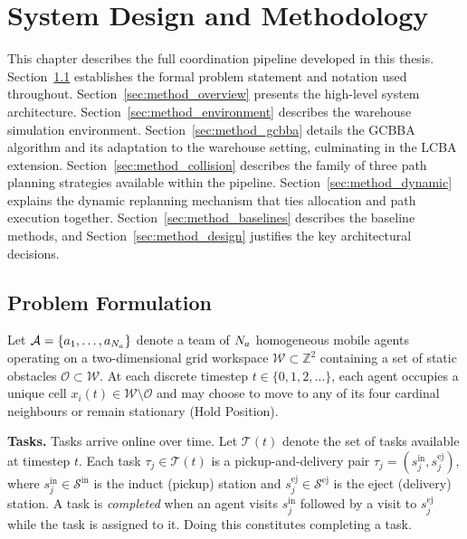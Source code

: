 \chapter{System Design and Methodology}
\label{chap:methodology}

This chapter describes the full coordination pipeline developed in this thesis.
Section~\ref{sec:method_formulation} establishes the formal problem statement
and notation used throughout.
Section~\ref{sec:method_overview} presents the high-level system architecture.
Section~\ref{sec:method_environment} describes the warehouse simulation environment.
Section~\ref{sec:method_gcbba} details the GCBBA algorithm and its adaptation
to the warehouse setting, culminating in the LCBA extension.
Section~\ref{sec:method_collision} describes the family of three path planning
strategies available within the pipeline.
Section~\ref{sec:method_dynamic} explains the dynamic replanning mechanism
that ties allocation and path execution together.
Section~\ref{sec:method_baselines} describes the baseline methods, and
Section~\ref{sec:method_design} justifies the key architectural decisions.


\section{Problem Formulation}
\label{sec:method_formulation}

Let $\mathcal{A} = \{a_1, \ldots, a_{N_a}\}$ denote a team of $N_a$ homogeneous
mobile agents operating on a two-dimensional grid workspace
$\mathcal{W} \subset \mathbb{Z}^2$ containing a set of static obstacles
$\mathcal{O} \subset \mathcal{W}$.
At each discrete timestep $t \in \{0, 1, 2, \ldots\}$, each agent occupies a
unique cell $x_i(t) \in \mathcal{W} \setminus \mathcal{O}$ and may choose to move to any
of its four cardinal neighbours or remain stationary (Hold Position).

\textbf{Tasks.}
Tasks arrive online over time.
Let $\mathcal{T}(t)$ denote the set of tasks available at timestep $t$.
Each task $\tau_j \in \mathcal{T}(t)$ is a pickup-and-delivery pair
$\tau_j = (s_j^{\text{in}}, s_j^{\text{ej}})$, where
$s_j^{\text{in}} \in \mathcal{S}^{\text{in}}$ is the induct (pickup) station and
$s_j^{\text{ej}} \in \mathcal{S}^{\text{ej}}$ is the eject (delivery) station.
A task is \emph{completed} when an agent visits $s_j^{\text{in}}$ followed by
a visit to $s_j^{\text{ej}}$ while the task is assigned to it.
Doing this constitutes completing a task.

